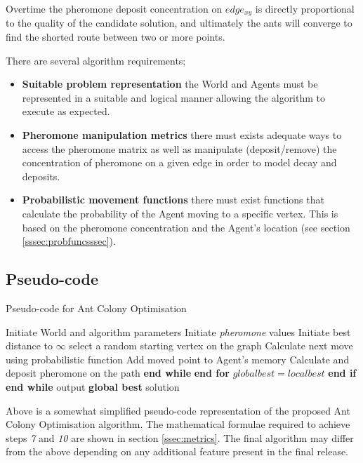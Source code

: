\documentclass[10pt,a4paper]{article}
\begin{document}
Overtime the pheromone deposit concentration on $edge_{xy}$ is directly proportional to the quality of the candidate solution, and ultimately the ants will converge to find the shorted route between two or more points.

There are several algorithm requirements;
\begin{itemize}
\item \textbf{Suitable problem representation} the World and Agents must be represented in a suitable and logical manner allowing the algorithm to execute as expected.
\item \textbf{Pheromone manipulation metrics} there must exists adequate ways to access the pheromone matrix as well as manipulate (deposit/remove) the concentration of pheromone on a given edge in order to model decay and deposits.
\item \textbf{Probabilistic movement functions} there must exist functions that calculate the probability of the Agent moving to a specific vertex. This is based on the pheromone concentration and the Agent’s location (see section \ref{sssec:probfuncsssec}).
\end{itemize}

\subsection{Pseudo-code}

\begin{algorithm}
\caption{Pseudo-code for Ant Colony Optimisation}
\label{aco:pseudo}
\begin{algorithmic}[1]
\State Initiate World and algorithm parameters
\State Initiate \textit{pheromone} values
\State Initiate best distance to $\infty$
\State select a random starting vertex on the graph
\State Calculate next move using probabilistic function 
\State Add moved point to Agent's memory
\State Calculate and deposit pheromone on the path
\EndWhile 
\State \textbf{end while}
\EndFor 
\State \textbf{end for}
\EndWhile
{}
\State $global best = local best$
\EndIf
\State \textbf{end if}
\State \textbf{end while}
\State output \textbf{global best} solution
\end{algorithmic}
\end{algorithm}

\noindent
Above is a somewhat simplified pseudo-code representation of the proposed Ant Colony Optimisation algorithm. The mathematical formulae required to achieve steps \textit{7} and \textit{10} are shown in section \ref{ssec:metrics}. The final algorithm may differ from the above depending on any additional feature present in the final release.
\end{document}
